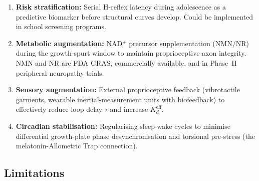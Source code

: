 \documentclass[12pt, letterpaper]{article}
\newcommand{\Kdeff}{K_d^{\mathrm{eff}}}
\begin{document}
\begin{enumerate}[label=\arabic*.]
  \item \textbf{Risk stratification:} Serial H-reflex latency during adolescence
    as a predictive biomarker before structural curves develop. Could be
    implemented in school screening programs.
  \item \textbf{Metabolic augmentation:} NAD$^{+}$ precursor supplementation
    (NMN/NR) during the growth-spurt window to maintain proprioceptive axon
    integrity. NMN and NR are FDA GRAS, commercially available, and in Phase~II
    peripheral neuropathy trials.
  \item \textbf{Sensory augmentation:} External proprioceptive feedback
    (vibrotactile garments, wearable inertial-measurement units with biofeedback)
    to effectively reduce loop delay $\tau$ and increase $\Kdeff$.
  \item \textbf{Circadian stabilisation:} Regularising sleep-wake cycles to
    minimise differential growth-plate phase desynchronisation and torsional
    pre-stress (the melatonin-Allometric Trap connection).
\end{enumerate}

\subsection{Limitations}
\end{document}
